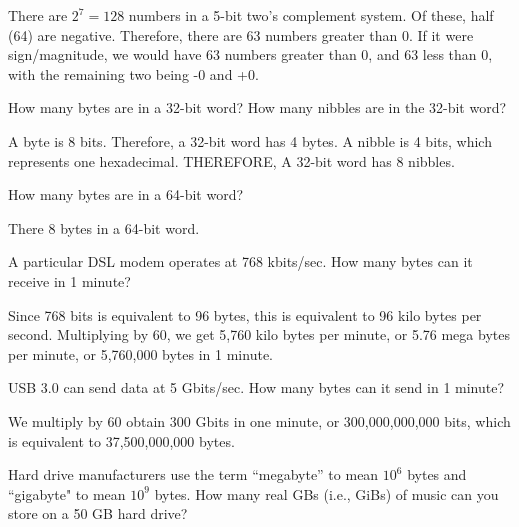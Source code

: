 \documentclass[12pt]{article}
\newenvironment{ex}[2][Exercise]{\begin{trivlist}
		\item[\hskip \labelsep {\bfseries #1}\hskip \labelsep {\bfseries #2.}]}{\end{trivlist}}
\newenvironment{sol}[1][Solution]{\begin{trivlist}
		\item[\hskip \labelsep {\bfseries #1:}]}{\end{trivlist}}
\begin{document}
\begin{sol}
	There are $2^{7}=128$ numbers in a 5-bit two's complement system. Of these, half (64) are negative. Therefore, there are 63 numbers greater than 0. If it were sign/magnitude, we would have 63 numbers greater than 0, and 63 less than 0, with the remaining two being -0 and +0.
\end{sol}

\begin{ex}{1.43}
	How many bytes are in a 32-bit word? How many nibbles are in the 32-bit word?
\end{ex}

\begin{sol}
	A byte is 8 bits. Therefore, a 32-bit word has 4 bytes. A nibble is 4 bits, which represents one hexadecimal. THEREFORE, A 32-bit word has 8 nibbles.
\end{sol}

\begin{ex}{1.44}
	How many bytes are in a 64-bit word?
\end{ex}

\begin{sol}
	There 8 bytes in a 64-bit word.
\end{sol}

\begin{ex}{1.45}
	A particular DSL modem operates at 768 kbits/sec. How many bytes can it receive in 1 minute?
\end{ex}

\begin{sol}
	Since 768 bits is equivalent to 96 bytes, this is equivalent to 96 kilo bytes per second. Multiplying by 60, we get 5,760 kilo bytes per minute, or 5.76 mega bytes per minute, or 5,760,000 bytes in 1 minute.
\end{sol}

\begin{ex}{1.46}
	USB 3.0 can send data at 5 Gbits/sec. How many bytes can it send in 1 minute?
\end{ex}

\begin{sol}
	We multiply by 60 obtain 300 Gbits in one minute, or 300,000,000,000 bits, which is equivalent to 37,500,000,000 bytes.
\end{sol}

\begin{ex}{1.47}
	Hard drive manufacturers use the term ``megabyte'' to mean $10^6$ bytes and ``gigabyte" to mean $10^9$ bytes. How many real GBs (i.e., GiBs) of music can you store on a 50 GB hard drive?
\end{ex}
\end{document}
